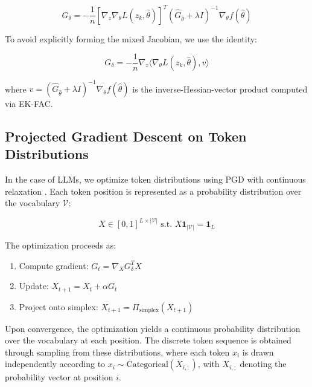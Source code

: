 \documentclass{article}
\theoremstyle{plain}
\theoremstyle{definition}
\theoremstyle{remark}
\begin{document}
\begin{equation}
G_\delta = -\frac{1}{n} [\nabla_z \nabla_\theta L(z_k, \hat{\theta})]^T (\hat{G}_{\hat{\theta}} + \lambda I)^{-1} \nabla_\theta f(\hat{\theta})
\end{equation}

To avoid explicitly forming the mixed Jacobian, we use the identity:

\begin{equation}
G_\delta = -\frac{1}{n} \nabla_z \langle \nabla_\theta L(z_k, \hat{\theta}), v \rangle
\end{equation}

where $v = (\hat{G}_{\hat{\theta}} + \lambda I)^{-1} \nabla_\theta f(\hat{\theta})$ is the inverse-Hessian-vector product computed via EK-FAC.

\subsection{Projected Gradient Descent on Token Distributions}

In the case of LLMs, we optimize token distributions using PGD with continuous relaxation \citep{geisler2024attacking}. Each token position is represented as a probability distribution over the vocabulary $\mathcal{V}$:

\begin{equation}
X \in [0,1]^{L \times |\mathcal{V}|} \text{ s.t. } X\mathbf{1}_{|\mathcal{V}|} = \mathbf{1}_L
\end{equation}

The optimization proceeds as:
\begin{enumerate}
    \item Compute gradient: $G_t = \nabla_X G_\delta^T X$
    \item Update: $X_{t+1} = X_t + \alpha G_t$
    \item Project onto simplex: $X_{t+1} = \Pi_{\text{simplex}}(X_{t+1})$
    
\end{enumerate}

Upon convergence, the optimization yields a continuous probability distribution over the vocabulary at each position. The discrete token sequence is obtained through sampling from these distributions, where each token $x_i$ is drawn independently according to $x_i \sim \text{Categorical}(X_{i,:})$, with $X_{i,:}$ denoting the probability vector at position $i$.

\end{document}
